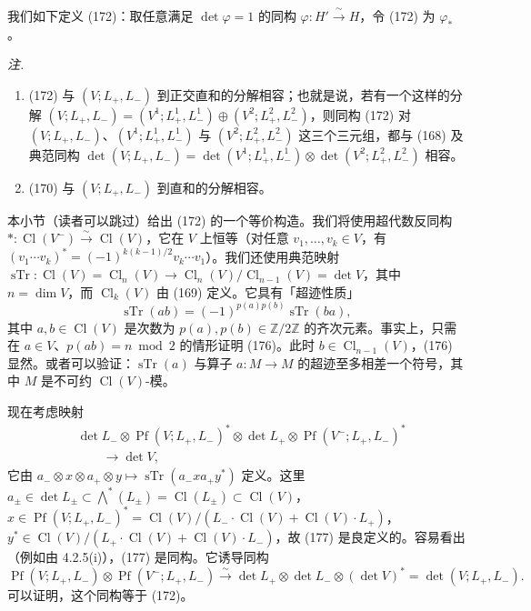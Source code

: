 我们如下定义 (172)：取任意满足 $\det\varphi=1$ 的同构 $\varphi:H'\xrightarrow{\ \sim\ }H$，令 (172) 为 $\varphi_{*}$。

\emph{注.}
\begin{enumerate}[label=(\roman*),leftmargin=2.2em]
\item (172) 与 $(V;L_{+},L_{-})$ 到正交直和的分解相容；也就是说，若有一个这样的分解 $(V;L_{+},L_{-})=(V^{1};L^{1}_{+},L^{1}_{-})\oplus(V^{2};L^{2}_{+},L^{2}_{-})$，则同构
(172) 对 $(V;L_{+},L_{-})$、$(V^{1};L^{1}_{+},L^{1}_{-})$ 与 $(V^{2};L^{2}_{+},L^{2}_{-})$ 这三个三元组，都与 (168) 及典范同构 $\det(V;L_{+},L_{-})=\det(V^{1};L^{1}_{+},L^{1}_{-})\otimes\det(V^{2};L^{2}_{+},L^{2}_{-})$ 相容。
\item (170) 与 $(V;L_{+},L_{-})$ 到直和的分解相容。
\end{enumerate}

 本小节（读者可以跳过）给出 (172) 的一个等价构造。我们将使用超代数反同构 $*:\operatorname{Cl}(V^{-})\xrightarrow{\ \sim\ }\operatorname{Cl}(V)$，它在 $V$ 上恒等（对任意 $v_{1},\dots,v_{k}\in V$，有 $(v_{1}\cdots v_{k})^{*}=(-1)^{k(k-1)/2}v_{k}\cdots v_{1}$）。我们还使用典范映射 $\operatorname{sTr}:\operatorname{Cl}(V)=\operatorname{Cl}_{n}(V)\to\operatorname{Cl}_{n}(V)/\operatorname{Cl}_{n-1}(V)=\det V$，其中 $n=\dim V$，而 $\operatorname{Cl}_{k}(V)$ 由 (169) 定义。它具有「超迹性质」
\begin{equation}\tag{176}
\operatorname{sTr}(ab)=(-1)^{p(a)p(b)}\operatorname{sTr}(ba),
\end{equation}
其中 $a,b\in\operatorname{Cl}(V)$ 是次数为 $p(a),p(b)\in\mathbb{Z}/2\mathbb{Z}$ 的齐次元素。事实上，只需在 $a\in V$、$p(ab)=n\bmod 2$ 的情形证明 (176)。此时 $b\in\operatorname{Cl}_{n-1}(V)$，(176) 显然。或者可以验证：$\operatorname{sTr}(a)$ 与算子 $a:M\to M$ 的超迹至多相差一个符号，其中 $M$ 是不可约 $\operatorname{Cl}(V)$-模。

现在考虑映射
\begin{equation}\tag{177}
\begin{aligned}
&\det L_{-}\otimes\operatorname{Pf}(V;L_{+},L_{-})^{*}\otimes\det L_{+}\otimes\operatorname{Pf}(V^{-};L_{+},L_{-})^{*}\\
&\qquad\longrightarrow\det V,
\end{aligned}
\end{equation}
它由 $a_{-}\otimes x\otimes a_{+}\otimes y\mapsto\operatorname{sTr}(a_{-}xa_{+}y^{*})$ 定义。这里 $a_{\pm}\in\det L_{\pm}\subset\bigwedge^{*}(L_{\pm})=\operatorname{Cl}(L_{\pm})\subset\operatorname{Cl}(V)$，$x\in\operatorname{Pf}(V;L_{+},L_{-})^{*}=\operatorname{Cl}(V)/(L_{-}\cdot\operatorname{Cl}(V)+\operatorname{Cl}(V)\cdot L_{+})$，$y^{*}\in\operatorname{Cl}(V)/(L_{+}\cdot\operatorname{Cl}(V)+\operatorname{Cl}(V)\cdot L_{-})$，故 (177) 是良定义的。容易看出（例如由 4.2.5(i)），(177) 是同构。它诱导同构
\[
\operatorname{Pf}(V;L_{+},L_{-})\otimes\operatorname{Pf}(V^{-};L_{+},L_{-})\xrightarrow{\ \sim\ }\det L_{+}\otimes\det L_{-}\otimes(\det V)^{*}=\det(V;L_{+},L_{-}).
\]
可以证明，这个同构等于 (172)。

